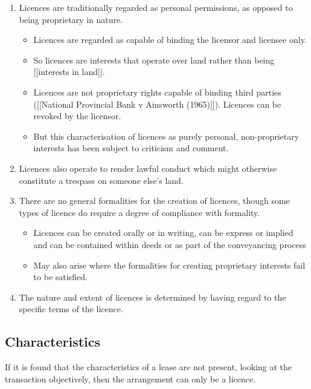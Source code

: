 \documentclass[
]{article}
\providecommand{\tightlist}{%
  \setlength{\itemsep}{0pt}\setlength{\parskip}{0pt}}
\begin{document}
\begin{enumerate}
\def\labelenumi{\arabic{enumi}.}
\tightlist
\item
  Licences are traditionally regarded as personal permissions, as
  opposed to being proprietary in nature.

  \begin{itemize}
  \tightlist
  \item
    Licences are regarded as capable of binding the licensor and
    licensee only.
  \item
    So licences are interests that operate over land rather than being
    {[}{[}interests in land{]}{]}.
  \item
    Licences are not proprietary rights capable of binding third parties
    ({[}{[}National Provincial Bank v Ainsworth (1965){]}{]}). Licences
    can be revoked by the licensor.
  \item
    But this characterisation of licences as purely personal,
    non-proprietary interests has been subject to criticism and comment.
  \end{itemize}
\item
  Licences also operate to render lawful conduct which might otherwise
  constitute a trespass on someone else's land.
\item
  There are no general formalities for the creation of licences, though
  some types of licence do require a degree of compliance with
  formality.

  \begin{itemize}
  \tightlist
  \item
    Licences can be created orally or in writing, can be express or
    implied and can be contained within deeds or as part of the
    conveyancing process
  \item
    May also arise where the formalities for creating proprietary
    interests fail to be satisfied.
  \end{itemize}
\item
  The nature and extent of licences is determined by having regard to
  the specific terms of the licence.
\end{enumerate}

\hypertarget{characteristics}{%
\subsection{Characteristics}\label{characteristics}}

If it is found that the characteristics of a lease are not present,
looking at the transaction objectively, then the arrangement can only be
a licence.
\end{document}
